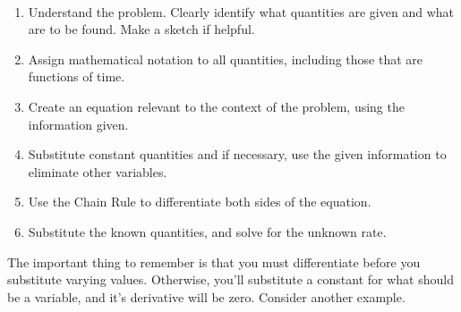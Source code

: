 \begin{keyidea}\label{idea:related_rates}%
~\\[-2\baselineskip]
\parbox[t]{\linewidth}{\begin{enumerate}
	\item	Understand the problem. Clearly identify what quantities are given and what are to be found. Make a sketch if helpful.
	\item	Assign mathematical notation to all quantities, including those that are functions of time.
	\item	Create an equation relevant to the context of the problem, using the information given.
	\item	Substitute constant quantities and if necessary, use the given information to eliminate other variables.
	\item	Use the Chain Rule to differentiate both sides of the equation.
	\item	Substitute the known quantities, and solve for the unknown rate.
\end{enumerate}}
\end{keyidea}

The important thing to remember is that you must differentiate before you substitute varying values.  Otherwise, you'll substitute a constant for what should be a variable, and it's derivative will be zero.  Consider another example.

